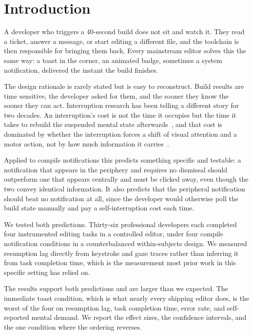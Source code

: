 \section{Introduction}
\label{sec:introduction}

A developer who triggers a 40-second build does not sit and watch it. They read
a ticket, answer a message, or start editing a different file, and the
toolchain is then responsible for bringing them back. Every mainstream editor
solves this the same way: a toast in the corner, an animated badge, sometimes a
system notification, delivered the instant the build finishes.

The design rationale is rarely stated but is easy to reconstruct. Build results
are time sensitive, the developer asked for them, and the sooner they know the
sooner they can act. Interruption research has been telling a different story
for two decades. An interruption's cost is not the time it occupies but the
time it takes to rebuild the suspended mental state
afterwards~\citep{brandt2011resumption,ferreiro2014fragmentation}, and that
cost is dominated by whether the interruption forces a shift of visual
attention and a motor action, not by how much information it
carries~\citep{okonjo2016peripheral}.

Applied to compile notifications this predicts something specific and testable:
a notification that appears in the periphery and requires no dismissal should
outperform one that appears centrally and must be clicked away, even though the
two convey identical information. It also predicts that the peripheral
notification should beat no notification at all, since the developer would
otherwise poll the build state manually and pay a self-interruption cost each
time.

We tested both predictions. Thirty-six professional developers each completed
four instrumented editing tasks in a controlled editor, under four compile
notification conditions in a counterbalanced within-subjects design. We
measured resumption lag directly from keystroke and gaze traces rather than
inferring it from task completion time, which is the measurement most prior
work in this specific setting has relied on.

The results support both predictions and are larger than we expected. The
immediate toast condition, which is what nearly every shipping editor does, is
the worst of the four on resumption lag, task completion time, error rate, and
self-reported mental demand. We report the effect sizes, the confidence
intervals, and the one condition where the ordering reverses.


